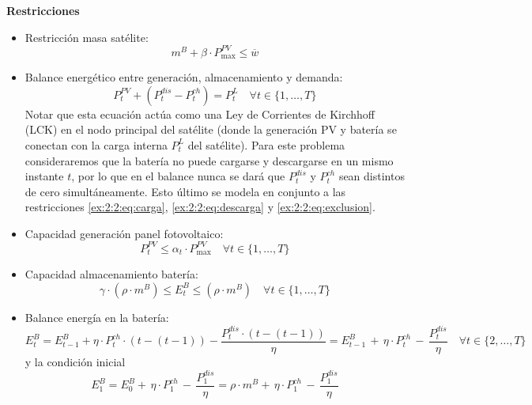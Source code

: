 \textbf{Restricciones}
\begin{itemize}
    \item Restricción masa satélite:
    \begin{equation}
        m^B + \beta \cdot P^{PV}_{\max} \leq \overline{w}
    \end{equation}

    \item Balance energético entre generación, almacenamiento y demanda:
    \begin{equation}
        P_t^{PV} + (P_t^{dis} - P_t^{ch}) = P_t^L
    \quad \forall t \in \{1,\ldots,T\}
    \end{equation}
    Notar que esta ecuación actúa como una Ley de Corrientes de Kirchhoff (LCK) en el nodo principal del satélite (donde la generación PV y batería se conectan con la carga interna $P_t^L$ del satélite). Para este problema consideraremos que la batería no puede cargarse y descargarse en un mismo instante $t$, por lo que en el balance nunca se dará que $P_t^{dis}$ y $P_t^{ch}$ sean distintos de cero simultáneamente. Esto último se modela en conjunto a las restricciones \eqref{ex:2:2:eq:carga}, \eqref{ex:2:2:eq:descarga} y \eqref{ex:2:2:eq:exclusion}.

    \item Capacidad generación panel fotovoltaico:
    \begin{equation}
        P_t^{PV} \leq \alpha_t \cdot P^{PV}_{\max}
    \quad \forall t \in \{1,\ldots,T\}
    \end{equation}

    \item Capacidad almacenamiento batería:
    \begin{equation}
        \gamma \cdot (\rho \cdot m^B) \leq E_t^B \leq (\rho \cdot m^B)
    \quad \forall t \in \{1,\ldots,T\}
    \end{equation}

    \item Balance energía en la batería:
    \begin{equation}
        E_t^B = E_{t-1}^B + \eta \cdot P_t^{ch} \cdot (t-(t-1)) - \frac{P_t^{dis} \cdot (t-(t-1)) }{\eta} = E_{t-1}^B \, + \, \eta \cdot P_t^{ch} \, - \, \frac{P_t^{dis}}{\eta}
    \quad \forall t \in \{2,\ldots,T\}
    \end{equation}
    y la condición inicial
    \begin{equation}
        E_1^B = E_0^B  + \, \eta \cdot P_1^{ch} \, - \, \frac{P_1^{dis}}{\eta}= \rho \cdot m^B + \, \eta \cdot P_1^{ch} \, - \, \frac{P_1^{dis}}{\eta}
    \end{equation}


\end{itemize}
